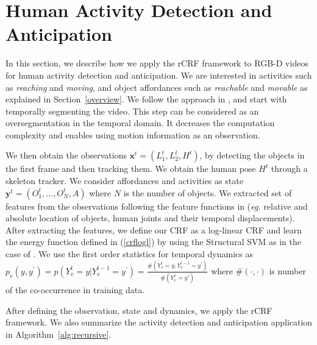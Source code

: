 \section{Human Activity Detection and Anticipation}
\label{rgbd}
In this section, we describe how we apply the rCRF framework to RGB-D videos for human activity detection and anticipation. We are interested in activities such as \emph{reaching} and \emph{moving}, and object affordances such as \emph{reachable} and \emph{movable} as explained in Section~\ref{overview}. We follow the approach in \cite{hemaIJRR}, and start with temporally segmenting the video. This step can be considered as an oversegmentation in the temporal domain. It decreases the computation complexity and enables using motion information as an observation.

We then obtain the observations $\mathbf{x}^t=(L_1^t,L_2^t,H^t)$, by detecting the objects in the first frame and then tracking them. We obtain the human pose $H^t$ through a skeleton tracker. We consider affordances and activities as state \mbox{$\mathbf{y}^t=(O^t_1,\ldots,O^t_N,A)$} where $N$ is the number of objects. We extracted set of features from the observations following the feature functions in \cite{hemaIJRR} (\emph{eg.} relative and absolute location of objects, human joints and their temporal displacements). After extracting the features, we define our CRF as a log-linear CRF and learn the energy function defined in (\ref{crflogl}) by using the Structural SVM \cite{ssvm} as in the case of \cite{hemaIJRR}. We use the first order statistics for temporal dynamics as \mbox{$p_v(y,y^\prime)=p(Y^t_v=y|Y^{t-1}_v=y^\prime)=\frac{\#(Y^t_v=y,Y^{t-1}_v=y^\prime)}{\#(Y^t_v=y\prime)}$} where $\#(\cdot,\cdot)$ is number of the co-occurrence in training data.

After defining the observation, state and dynamics, we apply the rCRF framework. We also summarize the activity detection and anticipation application in Algorithm~\ref{alg:recursive}.%

